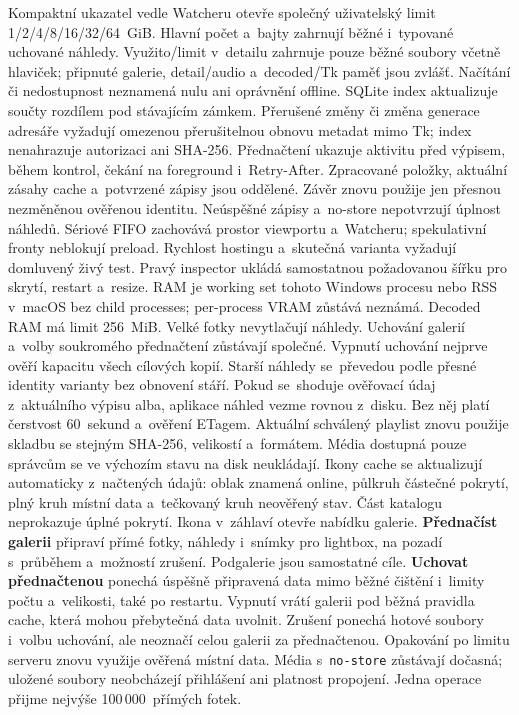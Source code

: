 \documentclass[11pt,a4paper]{article}
\newcommand{\ui}[1]{\textbf{#1}}
\begin{document}
Kompaktní ukazatel vedle Watcheru otevře společný uživatelský limit
1/2/4/8/16/32/64~GiB. Hlavní počet a~bajty zahrnují běžné i~typované uchované
náhledy. Využito/limit v~detailu zahrnuje pouze běžné soubory včetně hlaviček;
připnuté galerie, detail/audio a~decoded/Tk paměť jsou zvlášť.
Načítání či nedostupnost neznamená nulu ani oprávnění offline.
SQLite index aktualizuje součty rozdílem pod stávajícím zámkem. Přerušené
změny či změna generace adresáře vyžadují omezenou přerušitelnou obnovu
metadat mimo Tk; index nenahrazuje autorizaci ani SHA-256.
Přednačtení ukazuje aktivitu před výpisem, během kontrol, čekání na foreground
i~Retry-After. Zpracované položky, aktuální zásahy cache a~potvrzené zápisy
jsou oddělené. Závěr znovu použije jen přesnou nezměněnou ověřenou identitu.
Neúspěšné zápisy a~no-store nepotvrzují úplnost náhledů. Sériové FIFO
zachovává prostor viewportu a~Watcheru; spekulativní fronty neblokují preload.
Rychlost hostingu a~skutečná varianta vyžadují domluvený živý test.
Pravý inspector ukládá samostatnou požadovanou šířku pro skrytí, restart
a~resize. RAM je working set tohoto Windows procesu nebo RSS v~macOS bez
child processes; per-process VRAM zůstává neznámá. Decoded RAM má limit 256~MiB.
Velké fotky nevytlačují náhledy. Uchování galerií a~volby soukromého přednačtení
zůstávají společné. Vypnutí uchování nejprve ověří kapacitu všech cílových kopií.
Starší náhledy se~převedou podle přesné identity varianty bez obnovení stáří.
Pokud se~shoduje ověřovací údaj z~aktuálního
výpisu alba, aplikace náhled vezme rovnou z~disku. Bez něj platí čerstvost
60~sekund a~ověření ETagem. Aktuální schválený playlist znovu použije skladbu
se stejným SHA-256, velikostí a~formátem. Média dostupná pouze správcům se
ve výchozím stavu na disk neukládají.
Ikony cache se aktualizují automaticky z~načtených údajů: oblak znamená
online, půlkruh částečné pokrytí, plný kruh místní data a~tečkovaný kruh
neověřený stav. Část katalogu neprokazuje úplné pokrytí. Ikona v~záhlaví
otevře nabídku galerie.
\ui{Přednačíst galerii} připraví přímé fotky, náhledy i~snímky pro lightbox,
na pozadí s~průběhem a~možností zrušení. Podgalerie jsou samostatné cíle.
\ui{Uchovat přednačtenou} ponechá úspěšně připravená data mimo běžné čištění
i~limity počtu a~velikosti, také po restartu. Vypnutí vrátí galerii pod běžná
pravidla cache, která mohou přebytečná data uvolnit. Zrušení ponechá hotové
soubory i~volbu uchování, ale neoznačí celou galerii za přednačtenou.
Opakování po limitu serveru znovu využije ověřená místní data. Média
s~\texttt{no-store} zůstávají dočasná; uložené soubory neobcházejí přihlášení
ani platnost propojení. Jedna operace přijme nejvýše 100\,000~přímých fotek.
\end{document}

